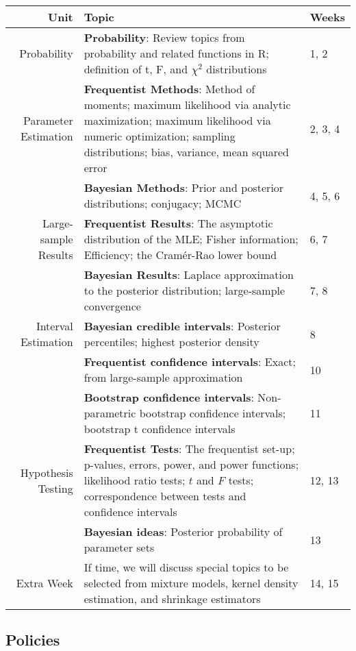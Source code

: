 \documentclass[11pt]{article}
\begin{document}
\begin{table}[!h]
\begin{tabular}{r p{11cm} l}
\toprule
Unit & Topic & Weeks \\
\midrule
Probability & \textbf{Probability}: Review topics from probability and related functions in R; definition of t, F, and $\chi^2$ distributions & 1, 2 \\
\midrule
Parameter Estimation & \textbf{Frequentist Methods}: Method of moments; maximum likelihood via analytic maximization; maximum likelihood via numeric optimization; sampling distributions; bias, variance, mean squared error & 2, 3, 4 \\
\cmidrule(r){2-3}
 & \textbf{Bayesian Methods}: Prior and posterior distributions; conjugacy; MCMC & 4, 5, 6 \\
\midrule
Large-sample Results & \textbf{Frequentist Results}: The asymptotic distribution of the MLE; Fisher information; Efficiency; the Cram\'{e}r-Rao lower bound & 6, 7 \\
\cmidrule(r){2-3}
 & \textbf{Bayesian Results}: Laplace approximation to the posterior distribution; large-sample convergence & 7, 8 \\
\midrule
Interval Estimation & \textbf{Bayesian credible intervals}: Posterior percentiles; highest posterior density & 8 \\
\cmidrule(r){2-3}
 & \textbf{Frequentist confidence intervals}: Exact; from large-sample approximation & 10 \\
\cmidrule(r){2-3}
 & \textbf{Bootstrap confidence intervals}: Non-parametric bootstrap confidence intervals; bootstrap t confidence intervals & 11 \\
\midrule
Hypothesis Testing & \textbf{Frequentist Tests}: The frequentist set-up; p-values, errors, power, and power functions; likelihood ratio tests; $t$ and $F$ tests; correspondence between tests and confidence intervals & 12, 13 \\
\cmidrule(r){2-3}
 & \textbf{Bayesian ideas}: Posterior probability of parameter sets & 13 \\
\midrule
Extra Week & If time, we will discuss special topics to be selected from mixture models, kernel density estimation, and shrinkage estimators & 14, 15 \\
\bottomrule
\end{tabular}
\end{table}

\newpage

\subsection*{Policies}
\end{document}
